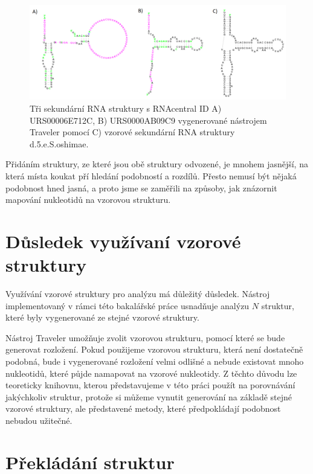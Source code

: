 \begin{figure}[H]
  \centering
  \includegraphics[width=140mm]{../img/kap02/intro/alignMotivationTemplate.png}
  \caption[Dvě odvozené sekundární struktury a jedna vzorová]{Tři sekundární
  RNA struktury s RNAcentral ID A) URS00006E712C, B) URS0000AB09C9 vygenerované
  nástrojem Traveler pomocí C) vzorové sekundární RNA struktury
  d.5.e.S.oshimae.}
  \label{bla}
\end{figure}

Přidáním struktury, ze které jsou obě struktury odvozené, je mnohem jasnější,
na která místa koukat pří hledání podobností a rozdílů. Přesto nemusí být
nějaká podobnost hned jasná, a proto jsme se zaměřili na způsoby, jak znázornit
mapování nukleotidů na vzorovou strukturu.

\section{Důsledek využívaní vzorové struktury}

Využívání vzorové struktury pro analýzu má důležitý důsledek. Nástroj
implementovaný v rámci této bakalářské práce usnadňuje analýzu $N$ struktur,
které byly vygenerované ze stejné vzorové struktury. 

Nástroj Traveler umožňuje zvolit vzorovou strukturu, pomocí které se bude
generovat rozložení. Pokud použijeme vzorovou strukturu, která není dostatečně
podobná, bude i vygenerované rozložení velmi odlišné a nebude existovat mnoho
nukleotidů, které půjde namapovat na vzorové nukleotidy. Z těchto důvodu lze
teoreticky knihovnu, kterou představujeme v této práci použít na porovnávání
jakýchkoliv struktur, protože si můžeme vynutit generování na základě stejné
vzorové struktury, ale představené metody, které předpokládají podobnost
nebudou užitečné. 

\section{Překládání struktur}

